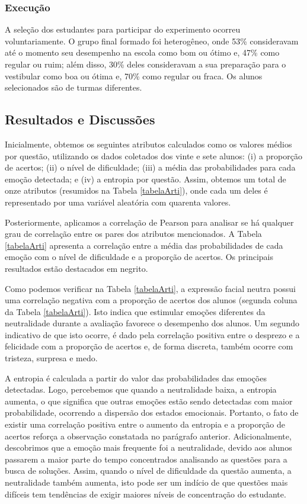\subsubsection{Execução}
A seleção dos estudantes para participar do experimento ocorreu voluntariamente. O grupo final formado foi heterogêneo, onde 53\% consideravam até o momento seu desempenho na escola como bom ou ótimo e, 47\% como regular ou ruim; além disso, 30\% deles consideravam a sua preparação para o vestibular como boa ou ótima e, 70\% como regular ou fraca. Os alunos selecionados são de turmas diferentes.

\subsection{Resultados e Discussões}
Inicialmente, obtemos os seguintes atributos calculados como os valores médios por questão, utilizando os dados coletados dos vinte e sete alunos: (i) a proporção de acertos; (ii) o nível de dificuldade; (iii) a média das probabilidades para cada emoção detectada; e (iv) a entropia por questão. Assim, obtemos um total de onze atributos (resumidos na Tabela \ref{tabelaArti}), onde cada um deles é representado por uma variável aleatória com quarenta valores.

Posteriormente, aplicamos a correlação de Pearson para analisar se há qualquer grau de correlação entre os pares dos atributos mencionados. A Tabela \ref{tabelaArti} apresenta a correlação entre a média das probabilidades de cada emoção com o nível de dificuldade e a proporção de acertos. Os principais resultados estão destacados em negrito.

Como podemos verificar na Tabela \ref{tabelaArti}, a expressão facial neutra possui uma correlação negativa com a proporção de acertos dos alunos (segunda coluna da Tabela \ref{tabelaArti}). Isto indica que estimular emoções diferentes da neutralidade durante a avaliação favorece o desempenho dos alunos. Um segundo indicativo de que isto ocorre, é dado pela correlação positiva entre o desprezo e a felicidade com a proporção de acertos e, de forma discreta, também ocorre com tristeza, surpresa e medo.

A entropia é calculada a partir do valor das probabilidades das emoções detectadas. Logo, percebemos que quando a neutralidade baixa, a entropia aumenta, o que significa que outras emoções estão sendo detectadas com maior probabilidade, ocorrendo a dispersão dos estados emocionais. Portanto, o fato de existir uma correlação positiva entre o aumento da entropia e a proporção de acertos reforça a observação constatada no parágrafo anterior. Adicionalmente, descobrimos que a emoção mais frequente foi a neutralidade, devido aos alunos passarem a maior parte do tempo concentrados analisando as questões para a busca de soluções. Assim, quando o nível de dificuldade da questão aumenta, a neutralidade também aumenta, isto pode ser um indício de que questões mais difíceis tem tendências de exigir maiores níveis de concentração do estudante.


